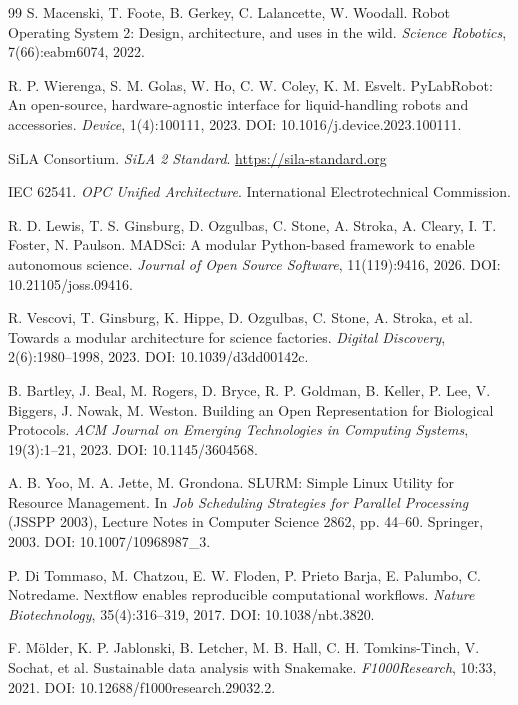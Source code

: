\documentclass[11pt]{article}
\begin{document}
\begin{thebibliography}{99}
 S. Macenski, T. Foote, B. Gerkey, C. Lalancette, W. Woodall. Robot
Operating System 2: Design, architecture, and uses in the wild. \emph{Science Robotics},
7(66):eabm6074, 2022.

 R. P. Wierenga, S. M. Golas, W. Ho, C. W. Coley, K. M. Esvelt.
PyLabRobot: An open-source, hardware-agnostic interface for liquid-handling robots and
accessories. \emph{Device}, 1(4):100111, 2023. DOI: 10.1016/j.device.2023.100111.

 SiLA Consortium. \emph{SiLA 2 Standard}. \url{https://sila-standard.org}

 IEC 62541. \emph{OPC Unified Architecture}. International Electrotechnical
Commission.

 R. D. Lewis, T. S. Ginsburg, D. Ozgulbas, C. Stone, A. Stroka, A. Cleary,
I. T. Foster, N. Paulson. MADSci: A modular Python-based framework to enable autonomous
science. \emph{Journal of Open Source Software}, 11(119):9416, 2026.
DOI: 10.21105/joss.09416.

 R. Vescovi, T. Ginsburg, K. Hippe, D. Ozgulbas, C. Stone, A. Stroka,
et al. Towards a modular architecture for science factories. \emph{Digital Discovery},
2(6):1980--1998, 2023. DOI: 10.1039/d3dd00142c.

 B. Bartley, J. Beal, M. Rogers, D. Bryce, R. P. Goldman, B. Keller, P. Lee,
V. Biggers, J. Nowak, M. Weston. Building an Open Representation for Biological Protocols.
\emph{ACM Journal on Emerging Technologies in Computing Systems}, 19(3):1--21, 2023.
DOI: 10.1145/3604568.

 A. B. Yoo, M. A. Jette, M. Grondona. SLURM: Simple Linux Utility for
Resource Management. In \emph{Job Scheduling Strategies for Parallel Processing} (JSSPP
2003), Lecture Notes in Computer Science 2862, pp. 44--60. Springer, 2003.
DOI: 10.1007/10968987\_3.

 P. Di Tommaso, M. Chatzou, E. W. Floden, P. Prieto Barja,
E. Palumbo, C. Notredame. Nextflow enables reproducible computational workflows.
\emph{Nature Biotechnology}, 35(4):316--319, 2017. DOI: 10.1038/nbt.3820.

 F. M\"older, K. P. Jablonski, B. Letcher, M. B. Hall,
C. H. Tomkins-Tinch, V. Sochat, et al. Sustainable data analysis with Snakemake.
\emph{F1000Research}, 10:33, 2021. DOI: 10.12688/f1000research.29032.2.


\end{thebibliography}
\end{document}
